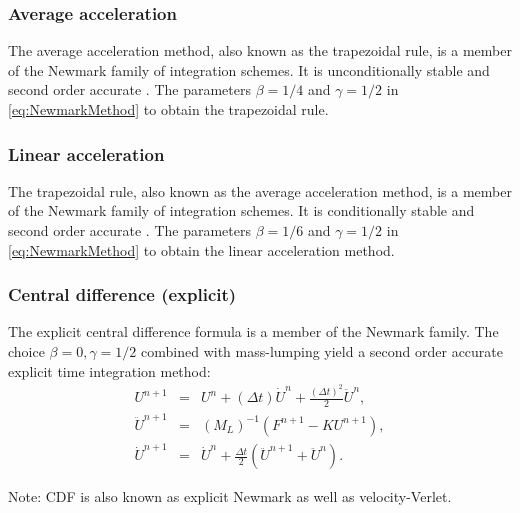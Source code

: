 \documentclass[12pt]{article}
\newcommand{\inverse}[1]{\ensuremath{{#1}^{-1}}} %
\begin{document}
\subsubsection{Average acceleration}

The average acceleration method, also known as the trapezoidal rule, is a 
member of the Newmark family of integration schemes.  
It is unconditionally stable and second order accurate \cite{Hughes2012}.
The parameters $\beta=1/4$ and $\gamma=1/2$ in \eqref{eq:NewmarkMethod}
to obtain the trapezoidal rule.

\subsubsection{Linear acceleration}

The trapezoidal rule, also known as the average acceleration
method, is a member of the Newmark family of integration schemes.  
It is conditionally stable and second order accurate \cite{Hughes2012}.
The parameters $\beta=1/6$ and $\gamma=1/2$ in \eqref{eq:NewmarkMethod}
to obtain the linear acceleration method.

\subsubsection{Central difference (explicit)}

The explicit central difference formula is a member of the Newmark
family.  The choice $\beta=0, \gamma=1/2$ combined with mass-lumping yield
a second order accurate explicit time integration method:
\begin{eqnarray}
U^{n+1} &=& U^n + (\Delta t)\dot{U}^n + \frac{(\Delta t)^2}{2}\ddot{U}^n,
%
\\
%
\ddot{U}^{n+1} &=& \inverse{(M_L)}(F^{n+1}-KU^{n+1}),
%
\\
%
\dot{U}^{n+1} &=& \dot{U}^n + \frac{\Delta t}{2}\left( \ddot{U}^{n+1} + \ddot{U}^n\right).
\end{eqnarray}

Note:  CDF is also known as explicit Newmark as well as velocity-Verlet.


\end{document}
